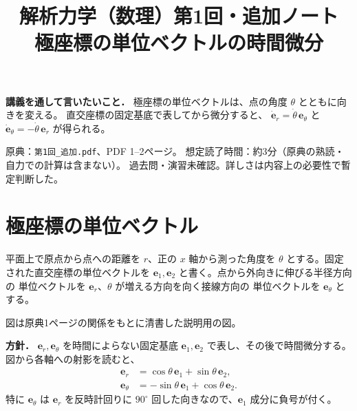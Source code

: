 \documentclass[a4paper,11pt]{ltjsarticle}
\title{解析力学（数理）第1回・追加ノート\\極座標の単位ベクトルの時間微分}
\author{}
\date{}
\newcommand{\ve}[1]{\boldsymbol{#1}}
\begin{document}
\maketitle

\noindent\textbf{講義を通して言いたいこと．}
極座標の単位ベクトルは、点の角度 $\theta$ とともに向きを変える。
直交座標の固定基底で表してから微分すると、
$\dot{\ve e}_r=\dot\theta\,\ve e_\theta$ と
$\dot{\ve e}_\theta=-\dot\theta\,\ve e_r$ が得られる。

\medskip
\noindent\small
原典：\texttt{第1回\_追加.pdf}、PDF 1--2ページ。
想定読了時間：約3分（原典の熟読・自力での計算は含まない）。
過去問・演習未確認。詳しさは内容上の必要性で暫定判断した。
\normalsize

\section{極座標の単位ベクトル}

平面上で原点から点への距離を $r$、正の $x$ 軸から測った角度を
$\theta$ とする。固定された直交座標の単位ベクトルを
$\ve e_1,\ve e_2$ と書く。点から外向きに伸びる半径方向の
単位ベクトルを $\ve e_r$、$\theta$ が増える方向を向く接線方向の
単位ベクトルを $\ve e_\theta$ とする。

\begin{center}

\small 図は原典1ページの関係をもとに清書した説明用の図。
\end{center}

\noindent\textbf{方針．}
$\ve e_r,\ve e_\theta$ を時間によらない固定基底
$\ve e_1,\ve e_2$ で表し、その後で時間微分する。
図から各軸への射影を読むと、
\begin{equation}\label{eq:basis}
\boxed{\begin{aligned}
\ve e_r &= \cos\theta\,\ve e_1+\sin\theta\,\ve e_2,\\
\ve e_\theta &= -\sin\theta\,\ve e_1+\cos\theta\,\ve e_2.
\end{aligned}}
\end{equation}
特に $\ve e_\theta$ は $\ve e_r$ を反時計回りに $90^\circ$
回した向きなので、$\ve e_1$ 成分に負号が付く。
\end{document}
